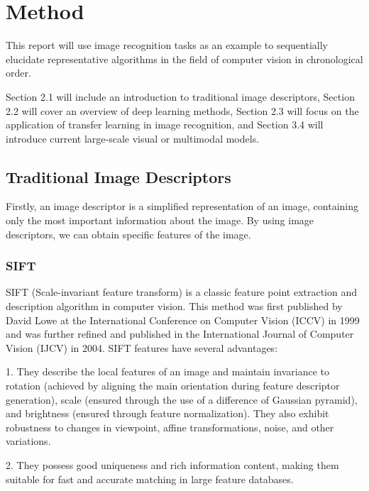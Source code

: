 \documentclass[10pt,twocolumn,letterpaper]{article}
\begin{document}
\section{Method}
\label{sec:formatting}

This report will use image recognition tasks as an example to sequentially elucidate representative algorithms in the field of computer vision in chronological order.

Section 2.1 will include an introduction to traditional image descriptors, Section 2.2 will cover an overview of deep learning methods, Section 2.3 will focus on the application of transfer learning in image recognition, and Section 3.4 will introduce current large-scale visual or multimodal models.

\subsection{Traditional Image Descriptors}

Firstly, an image descriptor is a simplified representation of an image, containing only the most important information about the image. By using image descriptors, we can obtain specific features of the image.

\subsubsection{SIFT}
   SIFT \cite{Alpher02} (Scale-invariant feature transform) is a classic feature point extraction and description algorithm in computer vision. This method was first published by David Lowe at the International Conference on Computer Vision (ICCV) in 1999 and was further refined and published in the International Journal of Computer Vision (IJCV) in 2004. SIFT features have several advantages:

1. They describe the local features of an image and maintain invariance to rotation (achieved by aligning the main orientation during feature descriptor generation), scale (ensured through the use of a difference of Gaussian pyramid), and brightness (ensured through feature normalization). They also exhibit robustness to changes in viewpoint, affine transformations, noise, and other variations.

2. They possess good uniqueness and rich information content, making them suitable for fast and accurate matching in large feature databases.
\end{document}
